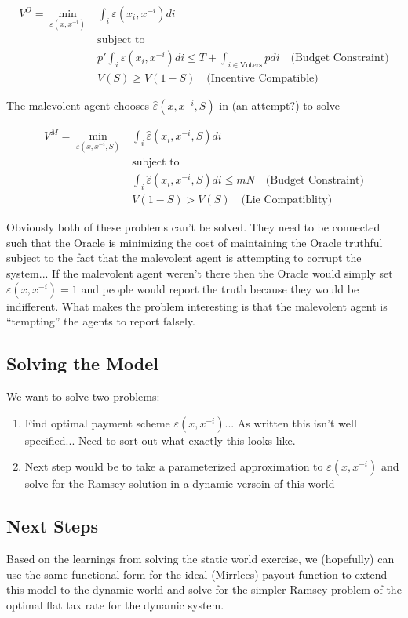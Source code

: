 \documentclass[12pt]{article}
\begin{document}
  \begin{align*}
    V^{O} = \min_{\varepsilon(x, x^{-i})} &\int_i \varepsilon(x_i, x^{-i}) di \\
    &\text{subject to } \\
    &p' \int_i \varepsilon(x_i, x^{-i}) di \leq T + \int_{i \in \text{Voters}} p di \quad \text{(Budget Constraint)} \\
    &V(S) \geq V(1 - S) \quad \text{(Incentive Compatible)}
  \end{align*}

  The malevolent agent chooses $\hat{\varepsilon}(x, x^{-i}, S)$ in (an attempt?) to solve

  \begin{align*}
    V^{M} = \min_{\hat{\varepsilon}(x, x^{-i}, S)} &\int_i \hat{\varepsilon}(x_i, x^{-i}, S) di \\
    &\text{subject to } \\
    &\int_i \hat{\varepsilon}(x_i, x^{-i}, S) di \leq mN \quad \text{(Budget Constraint)} \\
    &V(1 - S) > V(S) \quad \text{(Lie Compatiblity)}
  \end{align*}

  Obviously both of these problems can't be solved. They need to be connected such that the Oracle
  is minimizing the cost of maintaining the Oracle truthful subject to the fact that the malevolent
  agent is attempting to corrupt the system... If the malevolent agent weren't there then the Oracle
  would simply set $\varepsilon(x, x^{-i}) = 1$ and people would report the truth because they would
  be indifferent. What makes the problem interesting is that the malevolent agent is ``tempting''
  the agents to report falsely.

  \subsection{Solving the Model}

  We want to solve two problems:

  \begin{enumerate}
    \item Find optimal payment scheme $\varepsilon(x, x^{-i})$... As written this isn't well specified... Need to sort out what exactly this looks like.
    \item Next step would be to take a parameterized approximation to $\varepsilon(x, x^{-i})$ and solve for the Ramsey solution in a dynamic versoin of this world
  \end{enumerate}

  \subsection{Next Steps}

  Based on the learnings from solving the static world exercise, we (hopefully) can use the same functional form for the ideal (Mirrlees) payout function to extend this model to the dynamic world and solve for the simpler Ramsey problem of the optimal flat tax rate for the dynamic system.
\end{document}
